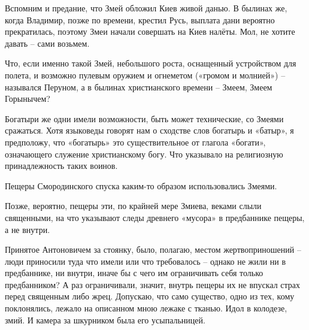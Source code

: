 
Вспомним и предание, что Змей обложил Киев живой данью. В былинах же, когда Владимир, позже по времени, крестил Русь, выплата дани вероятно прекратилась, поэтому Змеи начали совершать на Киев налёты. Мол, не хотите давать – сами возьмем.

Что, если именно такой Змей, небольшого роста, оснащенный устройством для полета, и возможно пулевым оружием и огнеметом («громом и молнией») – назывался Перуном, а в былинах христианского времени – Змеем, Змеем Горынычем?

Богатыри же одни имели возможности, быть может технические, со Змеями сражаться. Хотя языковеды говорят нам о сходстве слов богатырь и «батыр», я предположу, что «богатырь» это существительное от глагола «богати», означающего служение христианскому богу. Что указывало на религиозную принадлежность таких воинов.

Пещеры Смородинского спуска каким-то образом использовались Змеями.

Позже, вероятно, пещеры эти, по крайней мере Змиева, веками слыли священными, на что указывают следы древнего «мусора» в предбаннике пещеры, а не внутри.

Принятое Антоновичем за стоянку, было, полагаю, местом жертвоприношений – люди приносили туда что имели или что требовалось – однако не жили ни в предбаннике, ни внутри, иначе бы с чего им ограничивать себя только предбанником? А раз ограничивали, значит, внутрь пещеры их не впускал страх перед священным либо жрец. Допускаю, что само существо, одно из тех, кому поклонялись, лежало на описанном мною лежаке с тканью. Идол в колодезе, змий. И камера за шкурником была его усыпальницей.




